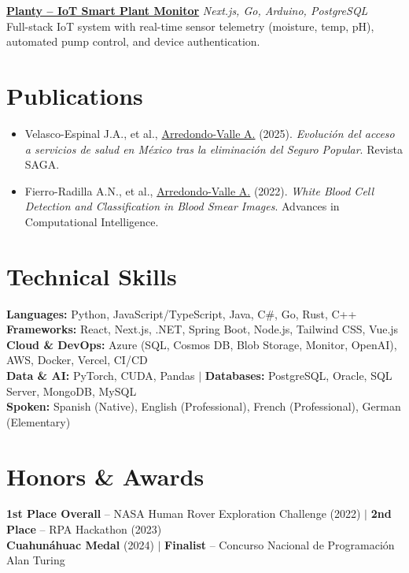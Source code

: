 \documentclass[10pt,a4paper]{article}
\begin{document}
\vspace{1pt}
\textbf{\href{https://github.com/ArmandoArV/Planty-Mono}{Planty -- IoT Smart Plant Monitor}} \hfill \textit{Next.js, Go, Arduino, PostgreSQL}\\
Full-stack IoT system with real-time sensor telemetry (moisture, temp, pH), automated pump control, and device authentication.

\section*{Publications}
\begin{itemize}
    \item Velasco-Espinal J.A., et al., \underline{Arredondo-Valle A.} (2025). \textit{Evoluci\'{o}n del acceso a servicios de salud en M\'{e}xico tras la eliminaci\'{o}n del Seguro Popular}. Revista SAGA.
    \item Fierro-Radilla A.N., et al., \underline{Arredondo-Valle A.} (2022). \textit{White Blood Cell Detection and Classification in Blood Smear Images}. Advances in Computational Intelligence.
\end{itemize}

\section*{Technical Skills}
\textbf{Languages:} Python, JavaScript/TypeScript, Java, C\#, Go, Rust, C++\\
\textbf{Frameworks:} React, Next.js, .NET, Spring Boot, Node.js, Tailwind CSS, Vue.js\\
\textbf{Cloud \& DevOps:} Azure (SQL, Cosmos DB, Blob Storage, Monitor, OpenAI), AWS, Docker, Vercel, CI/CD\\
\textbf{Data \& AI:} PyTorch, CUDA, Pandas \quad $\vert$ \quad \textbf{Databases:} PostgreSQL, Oracle, SQL Server, MongoDB, MySQL\\
\textbf{Spoken:} Spanish (Native), English (Professional), French (Professional), German (Elementary)

\section*{Honors \& Awards}
\textbf{1st Place Overall} -- NASA Human Rover Exploration Challenge (2022) \quad $\vert$ \quad \textbf{2nd Place} -- RPA Hackathon (2023)\\
\textbf{Cuahun\'{a}huac Medal} (2024) \quad $\vert$ \quad \textbf{Finalist} -- Concurso Nacional de Programaci\'{o}n Alan Turing
\end{document}

